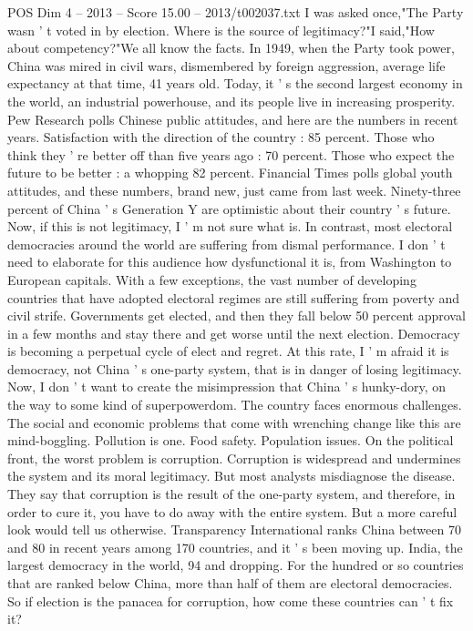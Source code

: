 \begin{textsample}{POS Dim 4 – 2013 – Score 15.00 – 2013/t002037.txt}
I was asked once,"The Party wasn ' t voted in by election.
Where is the source of legitimacy?"I said,"How about competency?"We all know the facts.
In 1949, when the Party took power, China was mired in civil wars, dismembered by foreign aggression, average life expectancy at that time, 41 years old.
Today, it ' s the second largest economy in the world, an industrial powerhouse, and its people live in increasing prosperity.
Pew Research polls Chinese public attitudes, and here are the numbers in recent years.
Satisfaction with the direction of the country : 85 percent.
Those who think they ' re better off than five years ago : 70 percent.
Those who expect the future to be better : a whopping 82 percent.
Financial Times polls global youth attitudes, and these numbers, brand new, just came from last week.
Ninety-three percent of China ' s Generation Y are optimistic about their country ' s future.
Now, if this is not legitimacy, I ' m not sure what is.
In contrast, most electoral democracies around the world are suffering from dismal performance.
I don ' t need to elaborate for this audience how dysfunctional it is, from Washington to European capitals.
With a few exceptions, the vast number of developing countries that have adopted electoral regimes are still suffering from poverty and civil strife.
Governments get elected, and then they fall below 50 percent approval in a few months and stay there and get worse until the next election.
Democracy is becoming a perpetual cycle of elect and regret.
At this rate, I ' m afraid it is democracy, not China ' s one-party system, that is in danger of losing legitimacy.
Now, I don ' t want to create the misimpression that China ' s hunky-dory, on the way to some kind of superpowerdom.
The country faces enormous challenges.
The social and economic problems that come with wrenching change like this are mind-boggling.
Pollution is one.
Food safety.
Population issues.
On the political front, the worst problem is corruption.
Corruption is widespread and undermines the system and its moral legitimacy.
But most analysts misdiagnose the disease.
They say that corruption is the result of the one-party system, and therefore, in order to cure it, you have to do away with the entire system.
But a more careful look would tell us otherwise.
Transparency International ranks China between 70 and 80 in recent years among 170 countries, and it ' s been moving up.
India, the largest democracy in the world, 94 and dropping.
For the hundred or so countries that are ranked below China, more than half of them are electoral democracies.
So if election is the panacea for corruption, how come these countries can ' t fix it?

\end{textsample}
